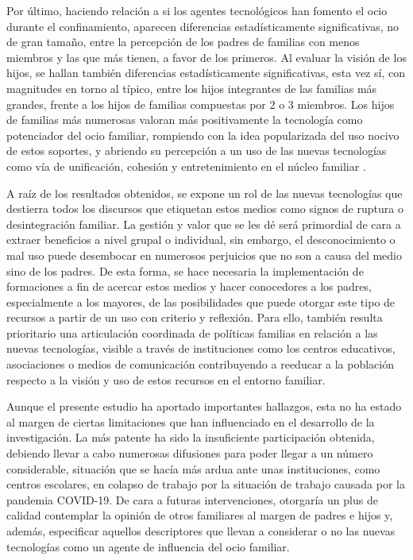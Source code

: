 \documentclass{textolivre}
\begin{document}
Por último, haciendo relación a si los agentes tecnológicos han fomento el ocio durante el confinamiento, aparecen diferencias estadísticamente significativas, no de gran tamaño, entre la percepción de los padres de familias con menos miembros y las que más tienen, a favor de los primeros. Al evaluar la visión de los hijos, se hallan también diferencias estadísticamente significativas, esta vez sí, con magnitudes en torno al típico, entre los hijos integrantes de las familias más grandes, frente a los hijos de familias compuestas por 2 o 3 miembros. Los hijos de familias más numerosas valoran más positivamente la tecnología como potenciador del ocio familiar, rompiendo con la idea popularizada del uso nocivo de estos soportes, y abriendo su percepción a un uso de las nuevas tecnologías como vía de unificación, cohesión y entretenimiento en el núcleo familiar \cite{doss2017}. 

A raíz de los resultados obtenidos, se expone un rol de las nuevas tecnologías que destierra todos los discursos que etiquetan estos medios como signos de ruptura o desintegración familiar. La gestión y valor que se les dé será primordial de cara a extraer beneficios a nivel grupal o individual, sin embargo, el desconocimiento o mal uso puede desembocar en numerosos perjuicios que no son a causa del medio sino de los padres. De esta forma, se hace necesaria la implementación de formaciones a fin de acercar estos medios y hacer conocedores a los padres, especialmente a los mayores, de las posibilidades que puede otorgar este tipo de recursos a partir de un uso con criterio y reflexión. Para ello, también resulta prioritario una articulación coordinada de políticas familias en relación a las nuevas tecnologías, visible a través de instituciones como los centros educativos, asociaciones o medios de comunicación contribuyendo a reeducar a la población respecto a la visión y uso de estos recursos en el entorno familiar. 

Aunque el presente estudio ha aportado importantes hallazgos, esta no ha estado al margen de ciertas limitaciones que han influenciado en el desarrollo de la investigación. La más patente ha sido la insuficiente participación obtenida, debiendo llevar a cabo numerosas difusiones para poder llegar a un número considerable, situación que se hacía más ardua ante unas instituciones, como centros escolares, en colapso de trabajo por la situación de trabajo causada por la pandemia COVID-19. De cara a futuras intervenciones, otorgaría un plus de calidad contemplar la opinión de otros familiares al margen de padres e hijos y, además, especificar aquellos descriptores que llevan a considerar o no las nuevas tecnologías como un agente de influencia del ocio familiar. 





\printbibliography\label{sec-bib}
\end{document}
